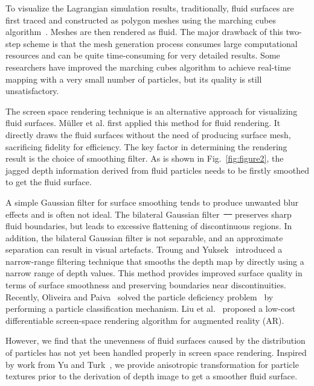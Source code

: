 \documentclass[times,twocolumn,final]{elsarticle}
\providecommand{\DIFaddtex}[1]{{\protect\color{blue}\uwave{#1}}} %
\providecommand{\DIFdeltex}[1]{{\protect\color{red}\sout{#1}}}                      %
\providecommand{\DIFaddbegin}{} %
\providecommand{\DIFaddend}{} %
\providecommand{\DIFdelbegin}{} %
\providecommand{\DIFdelend}{} %
\providecommand{\DIFadd}[1]{\texorpdfstring{\DIFaddtex{#1}}{#1}} %
\providecommand{\DIFdel}[1]{\texorpdfstring{\DIFdeltex{#1}}{}} %
\begin{document}
To visualize the Lagrangian simulation results, traditionally, fluid surfaces are first traced and constructed as polygon meshes using the marching cubes algorithm~\cite{ref:ref12,ref:ref6,yang2020completely}. Meshes are then rendered as fluid. The major drawback of this two-step scheme is that the mesh generation process consumes large computational resources and can be quite time-consuming for very detailed results. Some researchers have improved the marching cubes algorithm to achieve real-time mapping with a very small number of particles, but its quality is still unsatisfactory\cite{ref:ref10}.

The screen space rendering technique is an alternative approach for visualizing fluid surfaces. M{\"u}ller et al.\cite{ref:ref2} first applied this method for fluid rendering. It directly draws the fluid surfaces without the need of producing surface mesh, sacrificing fidelity for efficiency. The key factor in determining the rendering result is the choice of smoothing filter. As is shown in Fig.~\ref{fig:figure2}, the jagged depth information derived from fluid particles needs to be firstly smoothed to get the fluid surface. 

A simple Gaussian filter for surface smoothing\cite{ref:ref2} tends to produce unwanted blur effects and is often not ideal. The bilateral Gaussian filter~\DIFdelbegin \DIFdel{\mbox{%
\cite{ref:ref15,neto2017real} }\hspace{0pt}%
}\DIFdelend \DIFaddbegin \DIFadd{\mbox{%
\cite{ref:ref3,neto2017real} }\hspace{0pt}%
}\DIFaddend preserves sharp fluid boundaries, but leads to excessive flattening of discontinuous regions. In addition, the bilateral Gaussian filter is not separable, and an approximate separation can result in visual artefacts. Troung and Yuksek~\cite{truong2018narrow} introduced a narrow-range filtering technique that smooths the depth map by directly using a narrow range of depth values. This method provides improved surface quality in terms of surface smoothness and preserving boundaries near discontinuities.
Recently, Oliveira and Paiva~\cite{oliveira2022narrow} solved the particle deficiency problem~\cite{truong2018narrow} by performing a particle classification mechanism. Liu et al.~\cite{liu2022real} proposed a low-cost differentiable screen-space rendering algorithm for augmented reality (AR).

However, we find that the unevenness of fluid surfaces caused by the distribution of particles has not yet been handled properly in screen space rendering. Inspired by work from Yu and Turk~\cite{yu2013reconstructing}, we provide anisotropic transformation for particle textures prior to the derivation of depth image to get a smoother fluid surface.
\end{document}
